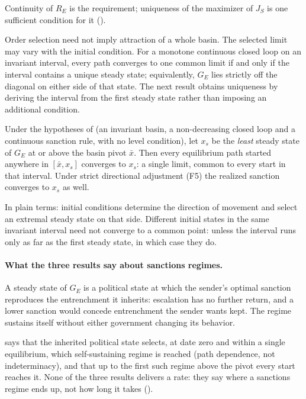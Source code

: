 Continuity of $R_E$ is the requirement; uniqueness of the maximizer of
$J_S$ is one sufficient condition for it
().

Order selection need not imply attraction of a whole basin. The selected limit may
vary with the initial condition. For a monotone continuous closed loop on an
invariant interval, every path converges to one common limit if and only if the
interval contains a unique steady state; equivalently, $G_E$ lies strictly off the
diagonal on either side of that state. The next result obtains uniqueness by
deriving the interval from the first steady state rather than imposing an
additional condition.

\begin{proposition}
\label{prop:derived-interval}
Under the hypotheses of  (an invariant basin, a
non-decreasing closed loop and a continuous sanction rule, with no level
condition), let $x_s$ be
the \emph{least} steady state of $G_E$ at or above the basin pivot $\bar x$. Then
every equilibrium path started anywhere in $[\bar x,x_s]$ converges to $x_s$:
a single limit, common to every start in that interval. Under strict directional
adjustment \textup{(F5)} the realized sanction converges to $x_s$ as well.
\end{proposition}

In plain terms: initial conditions determine the direction of movement and select
an extremal steady state on that side. Different initial states in the same
invariant interval need not converge to a common point: unless the interval
runs only as far as the first steady state, in which case they do.

\paragraph{What the three results say about sanctions regimes.}
A steady state of $G_E$ is a political state at which the sender's optimal
sanction reproduces the entrenchment it inherits: escalation has no further
return, and a lower sanction would concede entrenchment the sender wants kept. The regime
sustains itself without either government changing its behavior.

 says that the inherited political state selects,
at date zero and within a single equilibrium, which self-sustaining regime is
reached (path dependence, not indeterminacy), and
 that up to the first such regime above the pivot
every start reaches it. None of the three results delivers a rate: they say
where a sanctions regime ends up, not how long it takes
().

